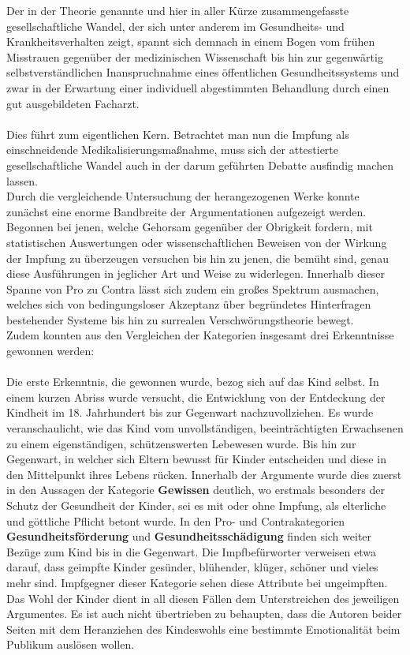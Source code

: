 \documentclass[
    a4paper,
    12pt,
    hyphens,
    chapterprefix=true,
    headheight=33pt,
    footheight=29pt,
    headings=optiontohead, %
]{scrartcl}
\begin{document}
{Der in der Theorie genannte und hier in aller Kürze zusammengefasste gesellschaftliche Wandel, der sich unter anderem im Gesundheits- und Krankheitsverhalten zeigt, spannt sich demnach in einem Bogen vom frühen Misstrauen gegenüber der medizinischen Wissenschaft bis hin zur gegenwärtig selbstverständlichen Inanspruchnahme eines öffentlichen
Gesundheitssystems und zwar in der Erwartung einer individuell abgestimmten Behandlung
durch einen gut ausgebildeten Facharzt.\\
\\
Dies führt zum eigentlichen Kern. Betrachtet man nun die Impfung als einschneidende Medikalisierungsmaßnahme, muss sich der attestierte gesellschaftliche Wandel auch in der darum geführten Debatte ausfindig machen lassen. \\
Durch die vergleichende Untersuchung der herangezogenen Werke konnte zunächst eine enorme Bandbreite der Argumentationen aufgezeigt werden. Begonnen bei jenen, welche Gehorsam gegenüber der Obrigkeit fordern, mit statistischen Auswertungen oder wissenschaftlichen
Beweisen von der Wirkung der Impfung zu überzeugen versuchen bis hin zu jenen, die bemüht sind, genau diese Ausführungen in jeglicher Art und Weise zu widerlegen. Innerhalb dieser Spanne von Pro zu Contra
lässt sich zudem ein großes Spektrum ausmachen, welches sich von bedingungsloser Akzeptanz über begründetes Hinterfragen bestehender Systeme bis hin zu surrealen Verschwörungstheorie bewegt.\\
Zudem konnten aus den Vergleichen der Kategorien insgesamt drei Erkenntnisse gewonnen werden:\\
\\
Die erste Erkenntnis, die gewonnen wurde, bezog sich auf das Kind selbst.
In einem kurzen Abriss wurde versucht, die Entwicklung von der Entdeckung der
Kindheit im 18. Jahrhundert bis zur Gegenwart nachzuvollziehen. Es wurde
veranschaulicht, wie das Kind vom unvollständigen, beeinträchtigten Erwachsenen zu
einem eigenständigen, schützenswerten Lebewesen wurde. Bis hin zur Gegenwart, in welcher sich
Eltern bewusst für Kinder entscheiden und diese in den Mittelpunkt ihres
Lebens rücken. Innerhalb der Argumente wurde dies zuerst in den Aussagen der Kategorie
\textbf{Gewissen} deutlich, wo erstmals besonders der
Schutz der Gesundheit der Kinder, sei es mit oder ohne Impfung, als
elterliche und göttliche Pflicht betont wurde. In den Pro- und Contrakategorien \textbf{Gesundheitsförderung} und \textbf{Gesundheitsschädigung} finden sich weiter Bezüge zum Kind bis in die Gegenwart. Die Impfbefürworter verweisen etwa darauf, dass geimpfte Kinder gesünder, blühender, klüger, schöner und vieles mehr sind. Impfgegner dieser Kategorie sehen diese Attribute bei ungeimpften. Das Wohl der Kinder dient in all diesen Fällen dem Unterstreichen des jeweiligen Argumentes. Es ist auch nicht übertrieben zu behaupten, dass die Autoren beider Seiten mit dem Heranziehen des Kindeswohls eine bestimmte Emotionalität beim Publikum auslösen wollen.\\
}
\end{document}
